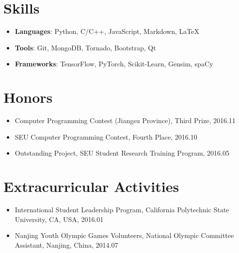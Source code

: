 \documentclass[letterpaper, 11pt]{article}
\newcommand{\resumeSingleSubItem}[1]{
   \item\small{#1} \vspace{-3pt}
}
\begin{document}
\section{Skills}
    \begin{itemize}[leftmargin=*, itemsep=0pt]
        \resumeSingleSubItem{\textbf{Languages}: Python, C/C++, JavaScript, Markdown, \LaTeX}
        \resumeSingleSubItem{\textbf{Tools}: Git, MongoDB, Tornado, Bootstrap, Qt}
        \resumeSingleSubItem{\textbf{Frameworks}: TensorFlow, PyTorch, Scikit-Learn, Gensim, spaCy}
    \end{itemize}\vspace{-10pt}

\section{Honors}
    \begin{itemize}[leftmargin=*, itemsep=0pt]
        \resumeSingleSubItem{Computer Programming Contest (Jiangsu Province), Third Prize, 2016.11}
        \resumeSingleSubItem{SEU Computer Programming Contest, Fourth Place, 2016.10}
        \resumeSingleSubItem{Outstanding Project, SEU Student Research Training Program, 2016.05}
    \end{itemize}\vspace{-10pt}

\section{Extracurricular Activities}
    \begin{itemize}[leftmargin=*, itemsep=0pt]
        \resumeSingleSubItem{International Student Leadership Program, California Polytechnic State University, CA, USA, 2016.01}
        \resumeSingleSubItem{Nanjing Youth Olympic Games Volunteers, National Olympic Committee Assistant, Nanjing, China, 2014.07}
    \end{itemize}\vspace{-10pt}


\end{document}
